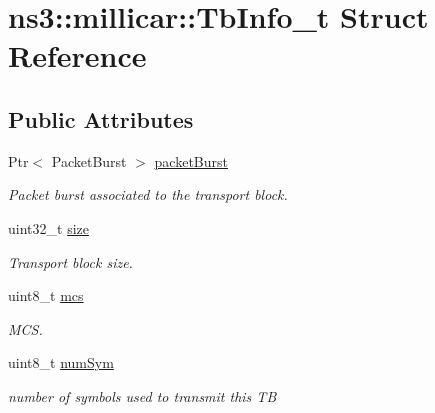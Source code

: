 \hypertarget{structns3_1_1millicar_1_1TbInfo__t}{}\section{ns3\+:\+:millicar\+:\+:Tb\+Info\+\_\+t Struct Reference}
\label{structns3_1_1millicar_1_1TbInfo__t}
\subsection*{Public Attributes}
\begin{DoxyCompactItemize}
\item 
\mbox{\label{structns3_1_1millicar_1_1TbInfo__t_a5b908b8d39f67299cc7fb0a8fa49eaab}} 
Ptr$<$ Packet\+Burst $>$ \hyperlink{structns3_1_1millicar_1_1TbInfo__t_a5b908b8d39f67299cc7fb0a8fa49eaab}{packet\+Burst}
\begin{DoxyCompactList}\small\item\em Packet burst associated to the transport block. \end{DoxyCompactList}\item 
\mbox{\label{structns3_1_1millicar_1_1TbInfo__t_a7d2345dd012a4bd60660b2565184445b}} 
uint32\+\_\+t \hyperlink{structns3_1_1millicar_1_1TbInfo__t_a7d2345dd012a4bd60660b2565184445b}{size}
\begin{DoxyCompactList}\small\item\em Transport block size. \end{DoxyCompactList}\item 
\mbox{\label{structns3_1_1millicar_1_1TbInfo__t_afa51577f7b4d9746d10252b4ba0a0e49}} 
uint8\+\_\+t \hyperlink{structns3_1_1millicar_1_1TbInfo__t_afa51577f7b4d9746d10252b4ba0a0e49}{mcs}
\begin{DoxyCompactList}\small\item\em M\+CS. \end{DoxyCompactList}\item 
\mbox{\label{structns3_1_1millicar_1_1TbInfo__t_a96d967f1f338fad94833ff303dc49748}} 
uint8\+\_\+t \hyperlink{structns3_1_1millicar_1_1TbInfo__t_a96d967f1f338fad94833ff303dc49748}{num\+Sym}
\begin{DoxyCompactList}\small\item\em number of symbols used to transmit this TB \end{DoxyCompactList}\item 

\end{DoxyCompactItemize}
